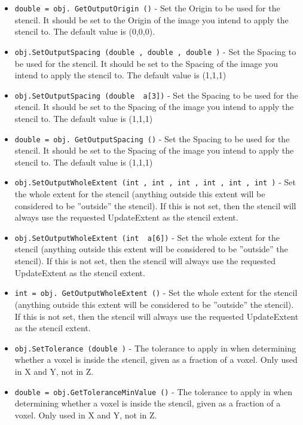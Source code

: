 \begin{itemize}
\item  \verb|double = obj. GetOutputOrigin ()| -  Set the Origin to be used for the stencil.  It should be
 set to the Origin of the image you intend to apply the
 stencil to. The default value is (0,0,0).

\item  \verb|obj.SetOutputSpacing (double , double , double )| -  Set the Spacing to be used for the stencil. It should be
 set to the Spacing of the image you intend to apply the
 stencil to. The default value is (1,1,1)

\item  \verb|obj.SetOutputSpacing (double  a[3])| -  Set the Spacing to be used for the stencil. It should be
 set to the Spacing of the image you intend to apply the
 stencil to. The default value is (1,1,1)

\item  \verb|double = obj. GetOutputSpacing ()| -  Set the Spacing to be used for the stencil. It should be
 set to the Spacing of the image you intend to apply the
 stencil to. The default value is (1,1,1)

\item  \verb|obj.SetOutputWholeExtent (int , int , int , int , int , int )| -  Set the whole extent for the stencil (anything outside
 this extent will be considered to be ''outside'' the stencil).
 If this is not set, then the stencil will always use
 the requested UpdateExtent as the stencil extent.

\item  \verb|obj.SetOutputWholeExtent (int  a[6])| -  Set the whole extent for the stencil (anything outside
 this extent will be considered to be ''outside'' the stencil).
 If this is not set, then the stencil will always use
 the requested UpdateExtent as the stencil extent.

\item  \verb|int = obj. GetOutputWholeExtent ()| -  Set the whole extent for the stencil (anything outside
 this extent will be considered to be ''outside'' the stencil).
 If this is not set, then the stencil will always use
 the requested UpdateExtent as the stencil extent.

\item  \verb|obj.SetTolerance (double )| -  The tolerance to apply in when determining whether a voxel
 is inside the stencil, given as a fraction of a voxel.
 Only used in X and Y, not in Z.

\item  \verb|double = obj.GetToleranceMinValue ()| -  The tolerance to apply in when determining whether a voxel
 is inside the stencil, given as a fraction of a voxel.
 Only used in X and Y, not in Z.


\end{itemize}
